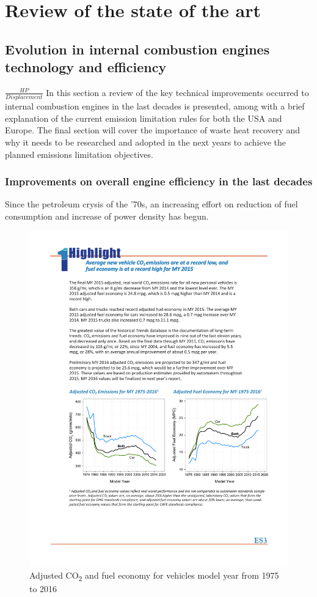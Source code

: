 \chapter{Review of the state of the art}

\section{Evolution in internal combustion engines technology and efficiency}
$\frac{HP}{Displacement}$
In this section a review of the key technical improvements occurred to internal combustion engines in the last decades is presented, among with a brief explanation of the current emission limitation rules for both the USA and Europe. The final section will cover the importance of waste heat recovery and why it needs to be researched and adopted in the next years to achieve the planned emissions limitation objectives.

\subsection{Improvements on overall engine efficiency in the last decades}

Since the petroleum crysis of the '70s, an increasing effort on reduction of fuel consumption and increase of power density has begun.

\begin{figure}[ht]
  \centering
  \includegraphics[width=\textwidth]{figures/review/adj_fuel_economy.pdf}
  \caption{Adjusted CO\textsubscript{2} and fuel economy for vehicles model year from 1975 to 2016\label{fig:adj_fuel_economy} }
\end{figure}

